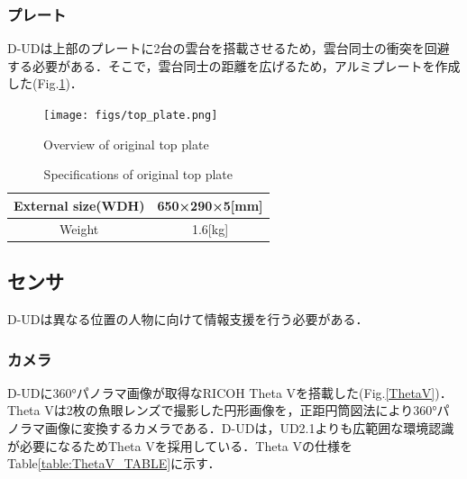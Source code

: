 \documentclass[12pt]{sonota/aislab}
\begin{document}
\subsubsection{プレート}
D-UDは上部のプレートに2台の雲台を搭載させるため，雲台同士の衝突を回避する必要がある．そこで，雲台同士の距離を広げるため，アルミプレートを作成した(Fig.\ref{plate})．

\begin{figure}[t]
\begin{center}
\texttt{[image: figs/top\_plate.png]}
\caption{Overview of original top plate}
\label{plate}
\end{center}
\end{figure}

\begin{table}[h]
	\caption{Specifications of original top plate}
	\label{table:plate}
	\centering 
	\begin{tabular}[tbp]{|c|c|}
		\hline 
		External size(WDH) & 650×290×5[mm] \\\hline
		Weight & 1.6[kg] \\\hline
	\end{tabular}
\end{table}

\subsection{センサ}
D-UDは異なる位置の人物に向けて情報支援を行う必要がある．

\subsubsection{カメラ}
D-UDに360°パノラマ画像が取得なRICOH Theta Vを搭載した(Fig.\ref{ThetaV})．Theta Vは2枚の魚眼レンズで撮影した円形画像を，正距円筒図法により360°パノラマ画像に変換するカメラである．D-UDは，UD2.1よりも広範囲な環境認識が必要になるためTheta Vを採用している．Theta Vの仕様をTable\ref{table:ThetaV_TABLE}に示す．
\end{document}
